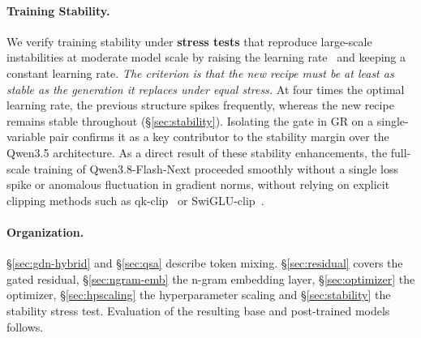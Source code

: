 \paragraph{Training Stability.}
We verify training stability under \textbf{stress tests} that reproduce large-scale instabilities at moderate model scale by raising the learning rate~\citep{wortsman2023smallscale} and keeping a constant learning rate. 
\textit{The criterion is that the new recipe must be at least as stable as the generation it replaces under equal stress.}
At four times the optimal learning rate, the previous structure spikes frequently, whereas the new recipe remains stable throughout (\S\ref{sec:stability}). 
Isolating the gate in GR on a single-variable pair confirms it as a key contributor to the stability margin over the Qwen3.5 architecture. 
As a direct result of these stability enhancements, the full-scale training of Qwen3.8-Flash-Next proceeded smoothly without a single loss spike or anomalous fluctuation in gradient norms, without relying on explicit clipping methods such as qk-clip~\citep{kimi2025k2} or SwiGLU-clip~\citep{agarwal2025gpt}.

\paragraph{Organization.}
\S\ref{sec:gdn-hybrid} and \S\ref{sec:qsa} describe token mixing.
\S\ref{sec:residual} covers the gated residual, \S\ref{sec:ngram-emb} the
n-gram embedding layer, \S\ref{sec:optimizer} the optimizer,
\S\ref{sec:hpscaling} the hyperparameter scaling and \S\ref{sec:stability}
the stability stress test. Evaluation of the resulting base and post-trained
models follows.